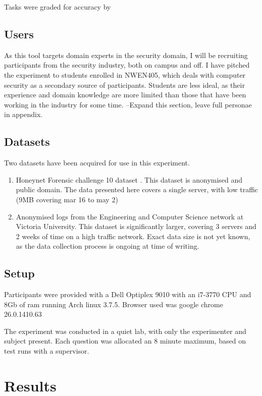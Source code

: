 Tasks were graded for accuracy by 

\subsection{Users}

As this tool targets domain experts in the security domain, I will be recruiting participants from the security industry, both on campus and off. I have pitched the experiment to students enrolled in NWEN405, which deals with computer security as a secondary source of participants. Students are less ideal, as their experience and domain knowledge are more limited than those that have been working in the industry for some time.
--Expand this section, leave full personae in appendix.

\subsection{Datasets}\label{data}

Two datasets have been acquired for use in this experiment.
\begin{enumerate}
\item{Honeynet Forensic challenge 10 dataset \cite{forensic10}. This dataset is anonymised and public domain. The data presented here covers a single server, with low traffic (9MB covering mar 16 to may 2)}
\item{Anonymised logs from the Engineering and Computer Science network at Victoria University. This dataset is significantly larger, covering 3 servers and 2 weeks of time on a high traffic network. Exact data size is not yet known, as the data collection process is ongoing at time of writing.}
\end{enumerate}

\subsection{Setup}
Participants were provided with a Dell Optiplex 9010 with an i7-3770 CPU and 8Gb of ram running Arch linux 3.7.5.
Browser used was google chrome 26.0.1410.63

The experiment was conducted in a quiet lab, with only the experimenter and subject present. Each question was allocated an 8 minute maximum, based on test runs with a supervisor.

\section{Results}

